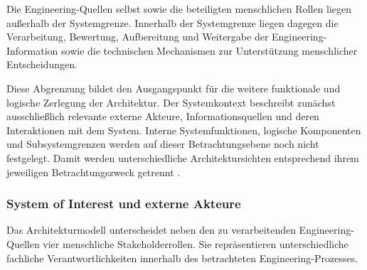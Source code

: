 Die Engineering-Quellen selbst sowie die beteiligten menschlichen Rollen liegen
außerhalb der Systemgrenze. Innerhalb der Systemgrenze liegen dagegen die
Verarbeitung, Bewertung, Aufbereitung und Weitergabe der Engineering-Information
sowie die technischen Mechanismen zur Unterstützung menschlicher
Entscheidungen.

Diese Abgrenzung bildet den Ausgangspunkt für die weitere funktionale und
logische Zerlegung der Architektur. Der Systemkontext beschreibt zunächst
ausschließlich relevante externe Akteure, Informationsquellen und deren
Interaktionen mit dem System. Interne Systemfunktionen, logische Komponenten und
Subsystemgrenzen werden auf dieser Betrachtungsebene noch nicht festgelegt.
Damit werden unterschiedliche Architektursichten entsprechend ihrem jeweiligen
Betrachtungszweck getrennt \cite{ISO42010_2022}.


\subsubsection{System of Interest und externe Akteure}
\label{sec:system_of_interest}

%
%
%
%
%
%
%
%
%
%
%
%
%
Das Architekturmodell unterscheidet neben den zu verarbeitenden
Engineering-Quellen vier menschliche Stakeholderrollen. Sie repräsentieren
unterschiedliche fachliche Verantwortlichkeiten innerhalb des betrachteten
Engineering-Prozesses.

